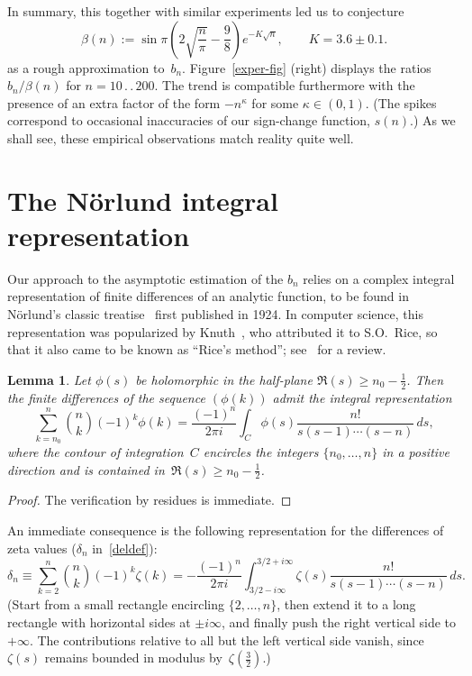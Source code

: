\documentclass{amsart}
\newtheorem{lemma}{Lemma}
\begin{document}
In summary, this together with similar experiments led us to conjecture 
\begin{equation}\label{conj}
\beta(n):=  \sin\pi\left(2\sqrt{\frac{n}{\pi}}-\frac{9}{8}\right)  e^{-K\sqrt{n}},
\qquad K=3.6\pm 0.1.
\end{equation}
as  a   rough approximation  to~$b_n$.  Figure~\ref{exper-fig} (right)
displays the ratios $b_n/\beta(n)$  for $n=10\,.\,.\,200$.   The trend  is
compatible furthermore with the presence  of
an   extra   factor   of     the  form   $-n^\kappa$   for   some
$\kappa\in(0,1)$. (The spikes
correspond  to    occasional inaccuracies  of  our sign-change function,    $s(n)$.) 
As we shall see, these empirical observations match reality quite well.


\section{The N\"orlund integral representation}

Our approach to the asymptotic estimation of the $b_n$ relies on
a complex integral representation of finite differences of an analytic function,
to be found in N\"orlund's classic treatise~\cite[\S VIII.5]{Norlund54} first published in 1924.
In computer science, this representation was popularized by Knuth~\cite{Knuth98a},
who attributed it to S.O.~Rice, so that
it also came to be known as ``Rice's method''; see~\cite{FlSe95}
for  a review. 

\begin{lemma} Let $\phi(s)$ be holomorphic in the half-plane 
$\Re(s)\ge n_0-\frac12$. Then the finite differences of the sequence
$(\phi(k))$ admit the integral representation
\[
\sum_{k=n_0}^n \binom{n}{k}(-1)^k\phi(k)=\frac{(-1)^n}{2\pi i}\int_C 
\phi(s) \frac{n!}{s(s-1)\cdots(s-n)}\, ds,\]
where the contour of integration~$C$ encircles the integers $\{n_0,\ldots,n\}$
in a positive direction and is contained in~$\Re(s)\ge n_0-\frac12$.
\end{lemma}
\begin{proof}
The verification by residues is immediate.
\end{proof}

An immediate consequence is the following representation for the 
differences of zeta values ($\delta_n$ in~\eqref{deldef}):
\begin{equation}\label{norbn}
\delta_n\equiv \sum_{k=2}^n \binom{n}{k}(-1)^k\zeta(k)
=-\frac{(-1)^n}{2\pi i}\int_{3/2-i\infty}^{3/2+i\infty} 
\zeta(s) \frac{n!}{s(s-1)\cdots(s-n)}\, ds. 
\end{equation}
(Start from a small rectangle encircling $\{2,\ldots,n\}$, then 
extend it to a long rectangle with horizontal sides at $\pm i\infty$,
and finally push the right vertical side to $+\infty$.
The contributions relative to 
all but the left vertical side vanish,
since $\zeta(s)$ remains bounded in modulus by~$\zeta(\frac32)$.)
\end{document}
